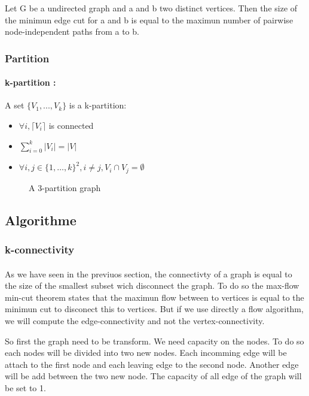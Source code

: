 Let G be a undirected graph and a and b two distinct vertices.
Then the size of the minimun edge cut for a and b is equal to the maximun number of pairwise node-independent paths from a to b.


\subsubsection{Partition}
\paragraph{k-partition :}
A set $\{V_1,...,V_k\}$ is a k-partition:
\begin{itemize}
    \item $\forall i, \lceil V_i \rceil$ is connected
    \item $\sum\limits_{i=0}^k|V_i| = |V|$
    \item $\forall i,j \in \{1, \dots, k\}^2, i \neq j, V_i \cap V_j = \emptyset$
\end{itemize}

\begin{figure}[!h]
    \begin{center}
        
    \end{center}
    \caption{A 3-partition graph}
\end{figure}

\subsection{Algorithme}
\subsubsection{k-connectivity}
\paragraph{}
As we have seen in the previuos section, the connectivty of a graph is equal to the size of the smallest subset wich disconnect the graph.
To do so the max-flow min-cut theorem states that the maximun flow between to vertices is equal to the minimun cut to disconect this to vertices.
But if we use directly a flow algorithm, we will compute the edge-connectivity and not the vertex-connectivity.

So first the graph need to be transform. We need capacity on the nodes. To do so each nodes will be divided into two new nodes. Each incomming edge will be attach to the first node and each leaving edge to the second node. Another edge will be add between the two new node.
The capacity of all edge of the graph will be set to 1.

